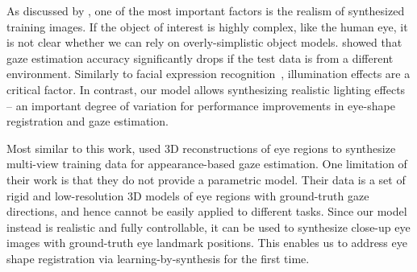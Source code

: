 As discussed by \citet{kaneva2011evaluation}, one of the most important factors is the realism of synthesized training images.
If the object of interest is highly complex, like the human eye, it is not clear whether we can rely on overly-simplistic object models.
\citet{zhang15_cvpr} showed that gaze estimation accuracy significantly drops if the test data is from a different environment.
Similarly to facial expression recognition~\cite{stratou2011effect}, illumination effects are a critical factor.
In contrast, our model allows synthesizing realistic lighting effects -- an important degree of variation for performance improvements in eye-shape registration and gaze estimation.

Most similar to this work, \citet{sugano2014learning} used 3D reconstructions of eye regions to synthesize multi-view training data for appearance-based gaze estimation.
One limitation of their work is that they do not provide a parametric model.
Their data is a set of rigid and low-resolution 3D models of eye regions with ground-truth gaze directions, and hence cannot be easily applied to different tasks.
Since our model instead is realistic and fully controllable, it can be used to synthesize close-up eye images with ground-truth eye landmark positions.
This enables us to address eye shape registration via learning-by-synthesis for the first time.


